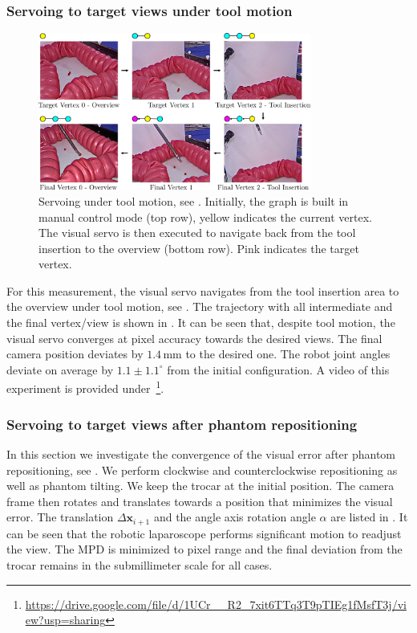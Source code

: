 \subsubsection{Servoing to target views under tool motion}
\label{c2:sec:clin_res_tool}
\begin{figure}[tb]
    \centering
    \includegraphics[width=0.8\textwidth]{img/tool_insertion_trajectory.pdf}
    \caption{Servoing under tool motion, see . Initially, the graph is built in manual control mode (top row), yellow indicates the current vertex. The visual servo is then executed to navigate back from the tool insertion to the overview (bottom row). Pink indicates the target vertex.}
    \label{c2:fig:tool_insertion_trajectory}
\end{figure}
For this measurement, the visual servo navigates from the tool insertion area to the overview under tool motion, see . The trajectory with all intermediate and the final vertex/view is shown in . It can be seen that, despite tool motion, the visual servo converges at pixel accuracy towards the desired views. The final camera position deviates by $1.4\,\text{mm}$ to the desired one. The robot joint angles deviate on average by $1.1\pm1.1^\circ$ from the initial configuration. A video of this experiment is provided under\ \footnote{\label{foot:vid}\url{https://drive.google.com/file/d/1UCr__R2_7xit6TTq3T9pTIEg1fMsfT3j/view?usp=sharing}}.

\subsubsection{Servoing to target views after phantom repositioning}
\label{c2:sec:clin_res_re}
In this section we investigate the convergence of the visual error after phantom repositioning, see . We perform clockwise and counterclockwise repositioning as well as phantom tilting. We keep the trocar at the initial position. The camera frame then rotates and translates towards a position that minimizes the visual error. The translation $\Delta\mathbf{x}_{i+1}$ and the angle axis rotation angle $\alpha$ are listed in . It can be seen that the robotic laparoscope performs significant motion to readjust the view. The MPD is minimized to pixel range and the final deviation from the trocar remains in the submillimeter scale for all cases. 

